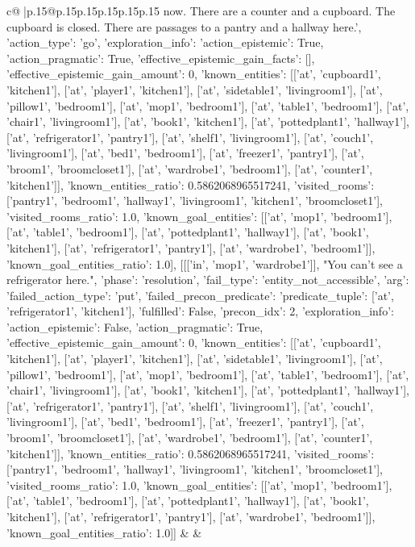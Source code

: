 \documentclass{article}
\begin{document}
{\begin{supertabular}{c@{$\;$}|p{.15\linewidth}@{}p{.15\linewidth}p{.15\linewidth}p{.15\linewidth}p{.15\linewidth}p{.15\linewidth}}
{{{now. There are a counter and a cupboard. The cupboard is closed. There are passages to a pantry and a hallway here.', {'action_type': 'go', 'exploration_info': {'action_epistemic': True, 'action_pragmatic': True, 'effective_epistemic_gain_facts': [], 'effective_epistemic_gain_amount': 0, 'known_entities': [['at', 'cupboard1', 'kitchen1'], ['at', 'player1', 'kitchen1'], ['at', 'sidetable1', 'livingroom1'], ['at', 'pillow1', 'bedroom1'], ['at', 'mop1', 'bedroom1'], ['at', 'table1', 'bedroom1'], ['at', 'chair1', 'livingroom1'], ['at', 'book1', 'kitchen1'], ['at', 'pottedplant1', 'hallway1'], ['at', 'refrigerator1', 'pantry1'], ['at', 'shelf1', 'livingroom1'], ['at', 'couch1', 'livingroom1'], ['at', 'bed1', 'bedroom1'], ['at', 'freezer1', 'pantry1'], ['at', 'broom1', 'broomcloset1'], ['at', 'wardrobe1', 'bedroom1'], ['at', 'counter1', 'kitchen1']], 'known_entities_ratio': 0.5862068965517241, 'visited_rooms': ['pantry1', 'bedroom1', 'hallway1', 'livingroom1', 'kitchen1', 'broomcloset1'], 'visited_rooms_ratio': 1.0, 'known_goal_entities': [['at', 'mop1', 'bedroom1'], ['at', 'table1', 'bedroom1'], ['at', 'pottedplant1', 'hallway1'], ['at', 'book1', 'kitchen1'], ['at', 'refrigerator1', 'pantry1'], ['at', 'wardrobe1', 'bedroom1']], 'known_goal_entities_ratio': 1.0}}], [[['in', 'mop1', 'wardrobe1']], "You can't see a refrigerator here.", {'phase': 'resolution', 'fail_type': 'entity_not_accessible', 'arg': {'failed_action_type': 'put', 'failed_precon_predicate': {'predicate_tuple': ['at', 'refrigerator1', 'kitchen1'], 'fulfilled': False, 'precon_idx': 2}}, 'exploration_info': {'action_epistemic': False, 'action_pragmatic': True, 'effective_epistemic_gain_amount': 0, 'known_entities': [['at', 'cupboard1', 'kitchen1'], ['at', 'player1', 'kitchen1'], ['at', 'sidetable1', 'livingroom1'], ['at', 'pillow1', 'bedroom1'], ['at', 'mop1', 'bedroom1'], ['at', 'table1', 'bedroom1'], ['at', 'chair1', 'livingroom1'], ['at', 'book1', 'kitchen1'], ['at', 'pottedplant1', 'hallway1'], ['at', 'refrigerator1', 'pantry1'], ['at', 'shelf1', 'livingroom1'], ['at', 'couch1', 'livingroom1'], ['at', 'bed1', 'bedroom1'], ['at', 'freezer1', 'pantry1'], ['at', 'broom1', 'broomcloset1'], ['at', 'wardrobe1', 'bedroom1'], ['at', 'counter1', 'kitchen1']], 'known_entities_ratio': 0.5862068965517241, 'visited_rooms': ['pantry1', 'bedroom1', 'hallway1', 'livingroom1', 'kitchen1', 'broomcloset1'], 'visited_rooms_ratio': 1.0, 'known_goal_entities': [['at', 'mop1', 'bedroom1'], ['at', 'table1', 'bedroom1'], ['at', 'pottedplant1', 'hallway1'], ['at', 'book1', 'kitchen1'], ['at', 'refrigerator1', 'pantry1'], ['at', 'wardrobe1', 'bedroom1']], 'known_goal_entities_ratio': 1.0}}]] 
	  } 
	   } 
	   } 
	 & & \\ 
 


\end{supertabular}}
\end{document}
